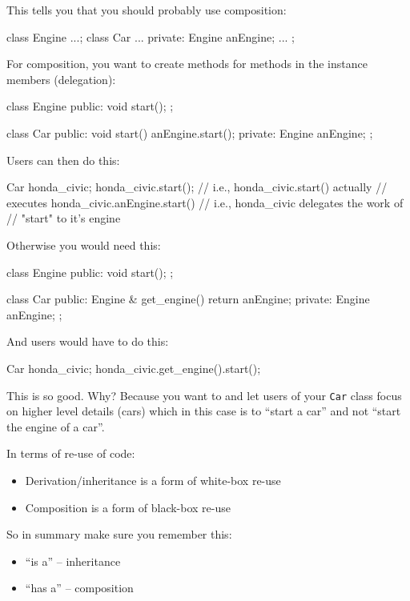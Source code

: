 This tells you that you should probably use composition:
\begin{console}
class Engine {...};
class Car {
...
private:
        Engine anEngine;
        ...
};
\end{console}

For composition, you want to create methods for methods in the instance
members (delegation):
\begin{console}
class Engine {
public:
        void start();
};

class Car {
public:
        void start() { anEngine.start(); }
private:
        Engine anEngine;
};
\end{console}

Users can then do this:
\begin{console}
Car honda_civic;
honda_civic.start();
// i.e., honda_civic.start() actually
// executes honda_civic.anEngine.start()
// i.e., honda_civic delegates the work of
// "start" to it's engine
\end{console}

Otherwise you would need this:
\begin{console}
class Engine {
public:
        void start();
};

class Car {
public:
        Engine & get_engine() { return anEngine; }
private:
        Engine anEngine;
};
\end{console}

And users would have to do this:
\begin{console}
Car honda_civic;
honda_civic.get_engine().start();
\end{console}

This is  so good. Why? Because you want to  and let users of your \verb!Car! class focus on higher level details (cars) which in this case is to ``start a car'' and not ``start the engine of a car''.

In terms of re-use of code:
\begin{itemize}
\item
  Derivation/inheritance is a form of white-box re-use
\item
  Composition is a form of black-box re-use
\end{itemize}

So in summary make sure you remember this:
\begin{itemize}
\item
  ``is a'' -- inheritance
\item
  ``has a'' -- composition
\end{itemize}

